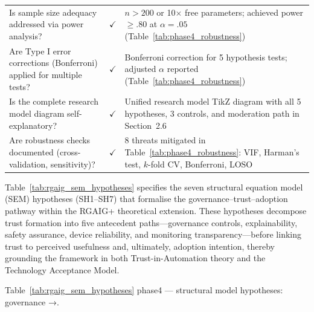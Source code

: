 \begin{xltabular}{\textwidth}{@{} p{0.35\textwidth} c p{0.45\textwidth} @{}}
\addlinespace
Is sample size adequacy addressed via power analysis?                      & $\checkmark$ & $n > 200$ or 10$\times$ free parameters; achieved power $\geq .80$ at $\alpha = .05$ (Table~\ref{tab:phase4_robustness}) \\
\addlinespace
Are Type I error corrections (Bonferroni) applied for multiple tests?      & $\checkmark$ & Bonferroni correction for 5 hypothesis tests; adjusted $\alpha$ reported (Table~\ref{tab:phase4_robustness}) \\
\addlinespace
Is the complete research model diagram self-explanatory?                   & $\checkmark$ & Unified research model TikZ diagram with all 5 hypotheses, 3 controls, and moderation path in Section~2.6 \\
\addlinespace
Are robustness checks documented (cross-validation, sensitivity)?          & $\checkmark$ & 8 threats mitigated in Table~\ref{tab:phase4_robustness}: VIF, Harman's test, $k$-fold CV, Bonferroni, LOSO \\
\end{xltabular}
\endgroup

\vspace{1.5em}


Table~\ref{tab:rgaig_sem_hypotheses} specifies the seven structural equation model (SEM) hypotheses (SH1--SH7) that formalise the governance--trust--adoption pathway within the RGAIG+ theoretical extension. These hypotheses decompose trust formation into five antecedent paths---governance controls, explainability, safety assurance, device reliability, and monitoring transparency---before linking trust to perceived usefulness and, ultimately, adoption intention, thereby grounding the framework in both Trust-in-Automation theory and the Technology Acceptance Model.

\begingroup\singlespacing\tablefontsize\tablestripes
\noindent Table~\ref{tab:rgaig_sem_hypotheses} phase4 --- structural model hypotheses: governance →.

